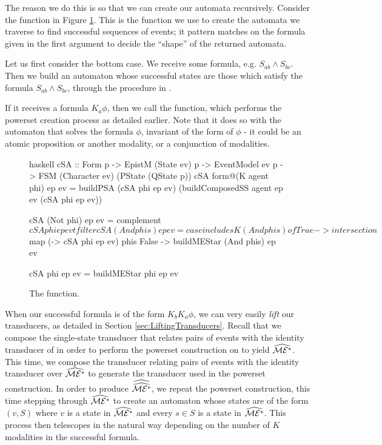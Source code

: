 \documentclass[ %
                    author={Leo Poulson},
                supervisor={Dr. Steven Ramsay},
                    degree={BSc},
                     title={Epistemic Planning for the Dynamic Gossip problem},
                  subtitle={},
                      year={2019} ]{dissertation}
\begin{document}
The reason we do this is so that we can create our automata recursively.
Consider the function in Figure \ref{fig:createSolvingAutomata}. This is the
function we use to create the automata we traverse to find successful sequences
of events; it pattern matches on the formula given in the first argument to
decide the ``shape'' of the returned automata.

Let us first consider the bottom case. We receive some formula, e.g. $S_{ab}
\land S_{bc}$. Then we build an automaton \mestar whose successful states are
those which satisfy the formula $S_{ab} \land S_{bc}$, through the procedure in
. 

If it receives a formula $K_a \phi$, then we call the 
function, which performs the powerset creation process as detailed earlier. Note
that it does so with the automaton that solves the formula $\phi$, invariant of
the form of $\phi$ - it could be an atomic proposition or another modality, or a
conjunction of modalities. 

\begin{figure}[h]
  \centering
  \begin{cminted}{haskell}
    cSA :: Form p -> EpistM (State ev) p -> EventModel ev p
           -> FSM (Character ev) (PState (QState p))
    cSA form@(K agent phi) ep ev
      = buildPSA 
                 (cSA phi ep ev) 
                 (buildComposedSS agent ep ev (cSA phi ep ev)) 

    cSA (Not phi) ep ev = complement $ cSA phi ep ev tfilter

    cSA (And phis) ep ev = case includesK (And phis) of
      True  -> intersection $ map (\phi -> cSA phi ep ev) phis
      False -> buildMEStar (And phis) ep ev

    cSA phi ep ev = buildMEStar phi ep ev
  \end{cminted}
  \caption{The  function.}
  \label{fig:createSolvingAutomata}
\end{figure}

When our successful formula is of the form $K_b K_a \phi$, we can very easily
\emph{lift} our transducers, as detailed in Section
\ref{sec:LiftingTransducers}. Recall that we compose the single-state transducer
that relates pairs of events with the identity transducer of \mestar in order to
perform the powerset construction on \mestar to yield $\widehat{\mathcal{ME^\ast}}$. This
time, we compose the transducer relating pairs of events with the identity
transducer over $\widehat{\mathcal{ME^\ast}}$ to generate the transducer used in the
powerset construction. In order to produce $\widehat{\widehat{\mathcal{ME^\ast}}}$, we repeat
the powerset construction, this time stepping through $\widehat{\mathcal{ME^\ast}}$ to
create an automaton whose states are of the form $(v, S)$ where $v$ is a state in
$\widehat{\mathcal{ME^\ast}}$ and every $s \in S$ is a state in $\widehat{\mathcal{ME^\ast}}$. This
process then telescopes in the natural way depending on the number of $K$
modalities in the successful formula.
\end{document}
